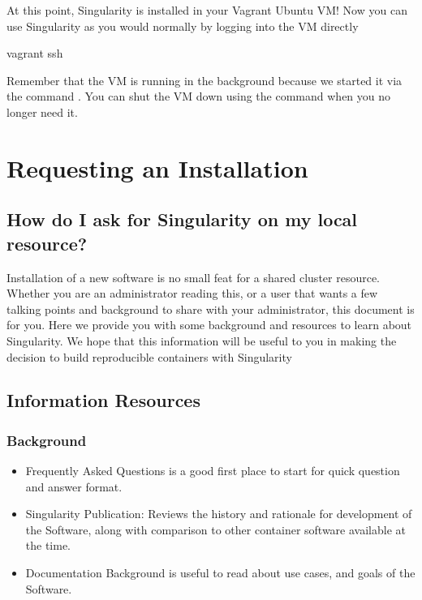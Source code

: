 \documentclass[letterpaper,10pt,english]{sphinxmanual}
\begin{document}
At this point, Singularity is installed in your Vagrant Ubuntu VM! Now you can use Singularity as you would normally by logging into the VM directly

%
\begin{sphinxVerbatim}[commandchars=\\\{\}]
vagrant ssh
\end{sphinxVerbatim}

Remember that the VM is running in the background because we started it via the command . You can shut the VM down using the command  when you no longer need it.


\section{Requesting an Installation}
\label{\detokenize{installation:requesting-an-installation}}

\subsection{How do I ask for Singularity on my local resource?}
\label{\detokenize{installation:how-do-i-ask-for-singularity-on-my-local-resource}}
Installation of a new software is no small feat for a shared cluster resource. Whether you are an administrator reading this, or a user that wants a few talking points and background to share with your administrator, this document is for you. Here we provide you with some background and resources to learn about Singularity. We hope that this information will be useful to you in making the decision to build reproducible containers with Singularity


\subsection{Information Resources}
\label{\detokenize{installation:information-resources}}

\subsubsection{Background}
\label{\detokenize{installation:background}}\begin{itemize}
\item {} 
Frequently Asked Questions is a good first place to start for quick question and answer format.

\item {} 
Singularity Publication: Reviews the history and rationale for development of the Software, along with comparison to other container software available at the time.

\item {} 
Documentation Background is useful to read about use cases, and goals of the Software.

\end{itemize}
\end{document}
